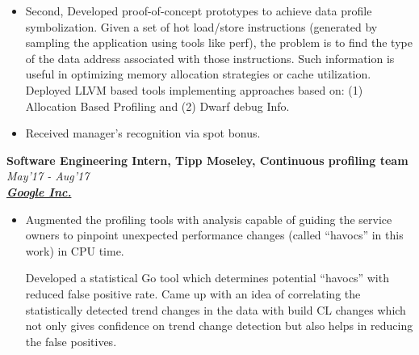 \documentclass[9pt]{article}
\newenvironment{changemargin}[2]{%
  \begin{list}{}{%
    \setlength{\topsep}{0pt}%
    \setlength{\leftmargin}{#1}%
    \setlength{\rightmargin}{#2}%
    \setlength{\listparindent}{\parindent}%
    \setlength{\itemindent}{\parindent}%
    \setlength{\parsep}{\parskip}%
  }%
  \item[]}{\end{list}
}
\newenvironment{body} {
	\vspace*{-16pt}
	\begin{changemargin}{-0.25in}{-0.5in}
  }	
	{\end{changemargin}
}
\begin{document}
\begin{body}
\begin{itemize}
\item Second, Developed proof-of-concept prototypes to achieve data profile symbolization.
                Given a set of hot load/store instructions (generated by
                    sampling the application using tools like perf), the
                problem is to find the type of the data address associated with
                those instructions. Such information is useful in optimizing memory
                allocation strategies or cache utilization.  Deployed
                LLVM based tools implementing approaches based on: (1)
                Allocation Based Profiling and (2) Dwarf debug Info.
                \item Received manager's recognition via spot bonus.
	\end{itemize}

        \textbf{Software Engineering Intern, Tipp Moseley, Continuous profiling team} \hfill \emph{May'17 - Aug'17}\\
	\textbf{\emph{\href{https://www.google.com/intl/en/about/}{Google Inc.}}}
	\begin{itemize} \itemsep -0pt
                \item  Augmented the profiling tools with analysis capable of
                guiding the service owners to pinpoint unexpected performance
                changes (called ``havocs'' in this work) in CPU time.

			Developed a statistical Go tool which determines
			potential ``havocs'' with reduced false positive rate.
			Came up with an idea of correlating the
			statistically detected trend changes in the data with
			build CL changes which not only gives confidence on
			trend change detection but also helps in reducing the
			false positives.

	\end{itemize}



\end{body}
\end{document}
